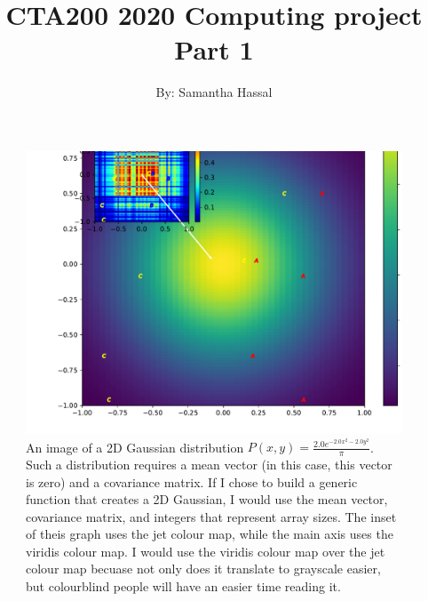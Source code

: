 \documentclass{article}
\title{CTA200 2020 Computing project Part 1}
\author{By: Samantha Hassal}
\date{}
\begin{document}
\begin{figure}
  \includegraphics[width=\linewidth]{SamanthaHassal-graphing-demo.pdf}
  \caption{An image of a 2D Gaussian distribution $P(x,y)=\frac{2.0 e^{- 2.0 x^{2} - 2.0 y^{2}}}{\pi}$. Such a distribution requires a mean vector (in this case, this vector is zero) and a covariance matrix. If I chose to build a generic function that creates a 2D Gaussian, I would use the mean vector, covariance matrix, and integers that represent array sizes. The inset of theis graph uses the jet colour map, while the main axis uses the viridis colour map. I would use the viridis colour map over the jet colour map becuase not only does it translate to grayscale easier, but colourblind people will have an easier time reading it.}
  \label{fig:2d-gaussian}
\end{figure}
\end{document}
